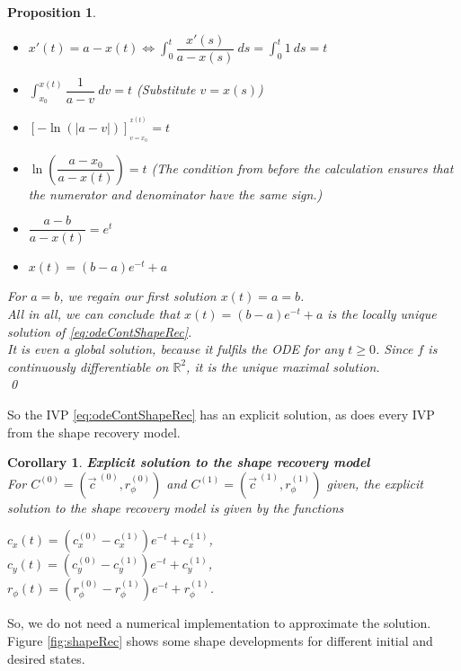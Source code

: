 \documentclass[a4paper,12pt,leqno]{article}
\theoremstyle{plain}
\newtheorem{proposition}[theorem]{Proposition}
\newtheorem{corollary}[theorem]{Corollary}
\theoremstyle{remark}
\newcommand{\R}{\mathbb{R}}
\begin{document}
\begin{proposition}
	\begin{itemize}
			\item[] $x'(t) = a - x(t) \iff \int_0^t \dfrac{x'(s)}{a - x(s)} \: ds = \int_0^t 1\: ds = t $
			\item[$\iff$]  $\int_{x_0}^{x(t)} \dfrac{1}{a - v} \: dv = t$ (Substitute $v = x(s)$) 
			\item[$\iff$] $[-\ln(|a - v|) ]_{_{v = x_0}}^{^{x(t)}} = t$
			\item[$\iff$] $ \ln(  \dfrac{a - x_0}{a - x(t)}) = t $ (The condition from before the calculation ensures that the numerator and denominator have the same sign.)
			\item[$\iff$] $\dfrac{a - b}{a - x(t)} = e^t$
			\item[$\iff$] $x(t) = (b - a)e^{-t} + a$ 
	\end{itemize}
	For $a=b$, we regain our first solution $x(t) = a = b$. \\
	All in all, we can conclude that $x(t) = (b - a)e^{-t} + a$ is the locally unique solution of \eqref{eq:odeContShapeRec}. \\
	It is even a global solution, because it fulfils the ODE for any $t \geq 0$. Since $f$ is continuously differentiable on $\R^2$, it is the unique maximal solution. \\
	\qed
\end{proposition}
So the IVP \eqref{eq:odeContShapeRec} has an explicit solution, as does every IVP from the shape recovery model. \\
\begin{corollary} \textbf{Explicit solution to the shape recovery model } \\
	For $C^{(0)} = (\vec{c}^{\:(0)}, r_{\phi}^{(0)})$ and $C^{(1)} = (\vec{c}^{\:(1)}, r_{\phi}^{(1)})$ given, the explicit solution to the shape recovery model is given by the functions
	\begin{center}
		$ c_x(t) = (c_x^{(0)} - c_x^{(1)})e^{-t} + c_x^{(1)} $, \\	\smallskip
		$ c_y(t) = (c_y^{(0)} - c_y^{(1)})e^{-t} + c_y^{(1)} $, \\		\smallskip
		$ r_\phi(t) = (r_\phi^{(0)} - r_\phi^{(1)})e^{-t} + r_\phi^{(1)} $. \\
	\end{center}
\end{corollary}
So, we do not need a numerical implementation to approximate the solution. Figure \ref{fig:shapeRec} shows some shape developments for different initial and desired states. \\
\end{document}
